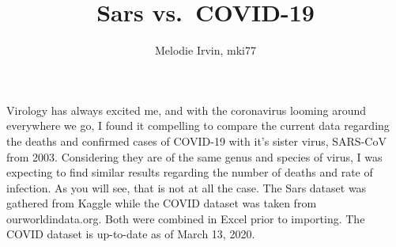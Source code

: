 \documentclass[
]{article}
\title{Sars vs.~COVID-19}
\author{Melodie Irvin, mki77}
\date{}
\newenvironment{Shaded}{\begin{snugshade}}{\end{snugshade}}
\newcommand{\DataTypeTok}[1]{\textcolor[rgb]{0.13,0.29,0.53}{#1}}
\newcommand{\DecValTok}[1]{\textcolor[rgb]{0.00,0.00,0.81}{#1}}
\newcommand{\KeywordTok}[1]{\textcolor[rgb]{0.13,0.29,0.53}{\textbf{#1}}}
\newcommand{\NormalTok}[1]{#1}
\newcommand{\OperatorTok}[1]{\textcolor[rgb]{0.81,0.36,0.00}{\textbf{#1}}}
\newcommand{\StringTok}[1]{\textcolor[rgb]{0.31,0.60,0.02}{#1}}
\begin{document}
\maketitle

Virology has always excited me, and with the coronavirus looming around
everywhere we go, I found it compelling to compare the current data
regarding the deaths and confirmed cases of COVID-19 with it's sister
virus, SARS-CoV from 2003. Considering they are of the same genus and
species of virus, I was expecting to find similar results regarding the
number of deaths and rate of infection. As you will see, that is not at
all the case. The Sars dataset was gathered from Kaggle while the COVID
dataset was taken from ourworldindata.org. Both were combined in Excel
prior to importing. The COVID dataset is up-to-date as of March 13,
2020.

\begin{Shaded}
\end{Shaded}
\end{document}
